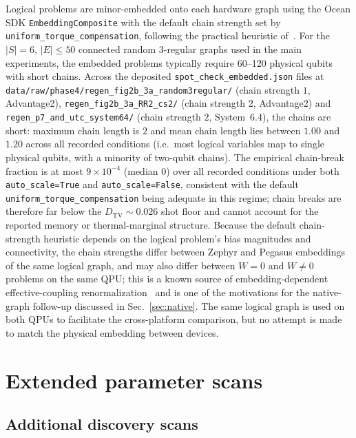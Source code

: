 \documentclass[aps,prapplied,reprint,superscriptaddress,floatfix,nofootinbib]{revtex4-2}
\begin{document}
Logical problems are minor-embedded onto each hardware graph using the Ocean SDK \texttt{EmbeddingComposite} with the default chain strength set by \texttt{uniform\_torque\_compensation}, following the practical heuristic of~\cite{cai2014minor}.
For the $|S|=6$, $|E| \leq 50$ connected random 3-regular graphs used in the main experiments, the embedded problems typically require 60--120 physical qubits with short chains.  Across the deposited \texttt{spot\_check\_embedded.json} files at \texttt{data/raw/phase4/regen\_fig2b\_3a\_random3regular/} (chain strength $1$, Advantage2), \texttt{regen\_fig2b\_3a\_RR2\_cs2/} (chain strength $2$, Advantage2) and \texttt{regen\_p7\_and\_utc\_system64/} (chain strength $2$, System~6.4), the chains are short: maximum chain length is $2$ and mean chain length lies between $1.00$ and $1.20$ across all recorded conditions (i.e.\ most logical variables map to single physical qubits, with a minority of two-qubit chains).  The empirical chain-break fraction is at most $9\times 10^{-4}$ (median $0$) over all recorded conditions under both \texttt{auto\_scale=True} and \texttt{auto\_scale=False}, consistent with the default \texttt{uniform\_torque\_compensation} being adequate in this regime; chain breaks are therefore far below the $D_\mathrm{TV}\sim 0.026$ shot floor and cannot account for the reported memory or thermal-marginal structure.
Because the default chain-strength heuristic depends on the logical problem's bias magnitudes and connectivity, the chain strengths differ between Zephyr and Pegasus embeddings of the same logical graph, and may also differ between $W=0$ and $W\neq 0$ problems on the same QPU; this is a known source of embedding-dependent effective-coupling renormalization~\cite{marshall2020embedding} and is one of the motivations for the native-graph follow-up discussed in Sec.~\ref{sec:native}.
The same logical graph is used on both QPUs to facilitate the cross-platform comparison, but no attempt is made to match the physical embedding between devices.

\section{Extended parameter scans}

\subsection{Additional discovery scans}
\label{sec:phase3}
\end{document}
